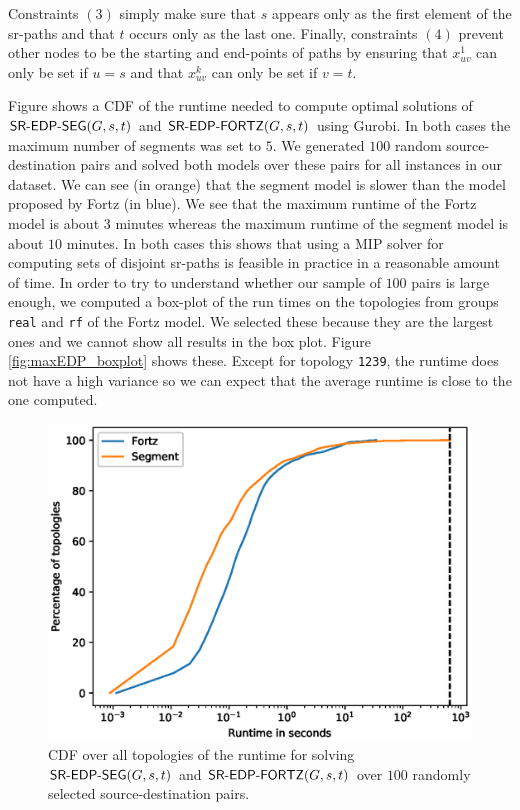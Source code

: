 Constraints $(3)$ simply make sure that $s$ appears only as the first element of the sr-paths and that $t$ occurs only as the last one.
Finally, constraints $(4)$ prevent other nodes to be the starting and end-points of paths by ensuring that $x^1_{uv}$ can only be set if $u = s$
and that $x^k_{uv}$ can only be set if $v = t$.

Figure \label{fig:maxEDP_runtime} shows a CDF of the runtime needed to compute optimal solutions of $\textsf{SR-EDP-SEG}(G, s, t)$  and $\textsf{SR-EDP-FORTZ}(G, s, t)$ using Gurobi. In
both cases the maximum number of segments was set to $5$. We generated
$100$ random source-destination pairs and solved both models over these pairs for all instances in our dataset. We can see (in orange) that the segment
model is slower than the model proposed by Fortz (in blue). We see that the maximum runtime of the Fortz model is about $3$ minutes whereas
the maximum runtime of the segment model is about $10$ minutes. In both cases this shows that using a MIP solver for computing sets of disjoint
sr-paths is feasible in practice in a reasonable amount of time. 
In order to try to understand whether our sample of $100$ pairs is large enough, we computed a box-plot of the run times on the topologies from groups
\texttt{real} and \texttt{rf} of the Fortz model. 
We selected these because they are the largest ones and we cannot show all results in the box plot. Figure \ref{fig:maxEDP_boxplot} shows these. Except for
topology \texttt{1239}, the runtime does not have a high variance so we can expect that the average runtime is close
to the one computed.

\begin{figure}
\begin{center}
\includegraphics[width=.85\columnwidth]{./Network-lib/data/plot/maxEDPMip_runtime_both.eps}
\end{center}
\caption{CDF over all topologies of the runtime for solving $\textsf{SR-EDP-SEG}(G, s, t)$ and $\textsf{SR-EDP-FORTZ}(G, s, t)$ over $100$ randomly selected source-destination pairs.}
\label{fig:maxEDP_runtime}
\end{figure}

